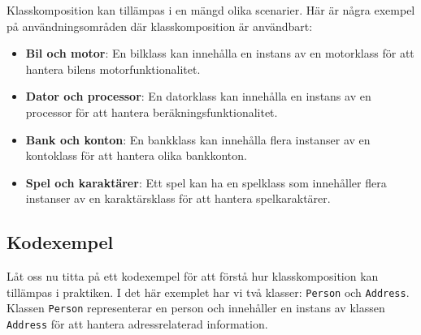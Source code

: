 Klasskomposition kan tillämpas i en mängd olika scenarier. Här är några
exempel på användningsområden där klasskomposition är användbart:

\begin{itemize}
\item
  \textbf{Bil och motor}: En bilklass kan innehålla en instans av en
  motorklass för att hantera bilens motorfunktionalitet.
\item
  \textbf{Dator och processor}: En datorklass kan innehålla en instans
  av en processor för att hantera beräkningsfunktionalitet.
\item
  \textbf{Bank och konton}: En bankklass kan innehålla flera instanser
  av en kontoklass för att hantera olika bankkonton.
\item
  \textbf{Spel och karaktärer}: Ett spel kan ha en spelklass som
  innehåller flera instanser av en karaktärsklass för att hantera
  spelkaraktärer.
\end{itemize}

\hypertarget{kodexempel}{%
\subsection{Kodexempel}\label{kodexempel}}

Låt oss nu titta på ett kodexempel för att förstå hur klasskomposition
kan tillämpas i praktiken. I det här exemplet har vi två klasser:
\texttt{Person} och \texttt{Address}. Klassen \texttt{Person}
representerar en person och innehåller en instans av klassen
\texttt{Address} för att hantera adressrelaterad information.


